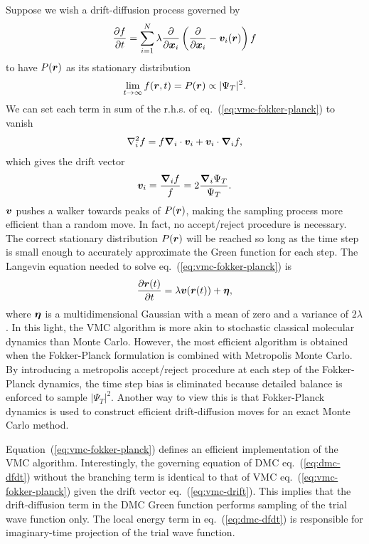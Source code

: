 Suppose we wish a drift-diffusion process governed by
\begin{align} \label{eq:vmc-fokker-planck}
\dfrac{\partial f}{\partial t} = \sum\limits_{i=1}^N \lambda\dfrac{\partial}{\partial\boldsymbol{x}_i}\left(
\dfrac{\partial}{\partial\boldsymbol{x}_i} -\boldsymbol{v}_i(\boldsymbol{r})
\right)f
\end{align}
to have $P(\boldsymbol{r})$ as its stationary distribution
\begin{align}
\lim\limits_{t\rightarrow\infty} f(\boldsymbol{r},t) = P(\boldsymbol{r}) \propto \vert\Psi_T\vert^2.
\end{align}
We can set each term in sum of the r.h.s. of eq.~(\ref{eq:vmc-fokker-planck}) to vanish
\begin{align}
\nabla_i^2 f = f\boldsymbol{\nabla}_i\cdot\boldsymbol{v}_i + \boldsymbol{v}_i\cdot\boldsymbol{\nabla}_if,
\end{align}
which gives the drift vector
\begin{align} \label{eq:vmc-drift}
\boldsymbol{v}_i = \dfrac{\boldsymbol{\nabla}_if}{f} = 2\dfrac{\boldsymbol{\nabla}_i\Psi_T}{\Psi_T}.
\end{align}
$\boldsymbol{v}$ pushes a walker towards peaks of $P(\boldsymbol{r})$, making the sampling process more efficient than a random move.
In fact, no accept/reject procedure is necessary.
The correct stationary distribution $P(\boldsymbol{r})$ will be reached so long as the time step is small enough to accurately approximate the Green function for each step.
The Langevin equation needed to solve eq.~(\ref{eq:vmc-fokker-planck}) is
\begin{align}
\dfrac{\partial\boldsymbol{r}(t)}{\partial t} = \lambda \boldsymbol{v}(\boldsymbol{r}(t)) + \boldsymbol{\eta},
\end{align}
where $\boldsymbol{\eta}$ is a multidimensional Gaussian with a mean of zero and a variance of $2\lambda$. In this light, the VMC algorithm is more akin to stochastic classical molecular dynamics than Monte Carlo. However, the most efficient algorithm is obtained when the Fokker-Planck formulation is combined with Metropolis Monte Carlo. By introducing a metropolis accept/reject procedure at each step of the Fokker-Planck dynamics, the time step bias is eliminated because detailed balance is enforced to sample $\vert\Psi_T\vert^2$. Another way to view this is that Fokker-Planck dynamics is used to construct efficient drift-diffusion moves for an exact Monte Carlo method.

Equation~(\ref{eq:vmc-fokker-planck}) defines an efficient implementation of the VMC algorithm. Interestingly, the governing equation of DMC eq.~(\ref{eq:dmc-dfdt}) without the branching term is identical to that of VMC eq.~(\ref{eq:vmc-fokker-planck}) given the drift vector eq.~(\ref{eq:vmc-drift}).
This implies that the drift-diffusion term in the DMC Green function performs sampling of the trial wave function only. The local energy term in eq.~(\ref{eq:dmc-dfdt}) is responsible for imaginary-time projection of the trial wave function.

